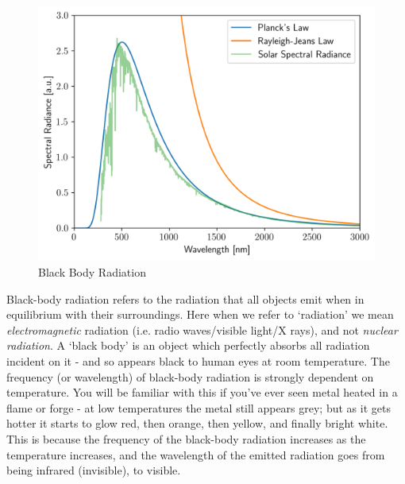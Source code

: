 \documentclass{memoir}[11pt,oneside,a4paper,openany]
\begin{document}
\begin{figure}
	\includegraphics[width=\linewidth]{black_body.png}
	\caption{Black Body Radiation}\label{fig:black_body}
\end{figure}
Black-body radiation refers to the radiation that all objects emit when in equilibrium with their surroundings. Here when we refer to `radiation' we mean \emph{electromagnetic} radiation (i.e. radio waves/visible light/X rays), and not \emph{nuclear radiation}. A `black body' is an object which perfectly absorbs all radiation incident on it - and so appears black to human eyes at room temperature. The frequency (or wavelength) of black-body radiation is strongly dependent on temperature. You will be familiar with this if you've ever seen metal heated in a flame or forge - at low temperatures the metal still appears grey; but as it gets hotter it starts to glow red, then orange, then yellow, and finally bright white. This is because the frequency of the black-body radiation increases as the temperature increases, and the wavelength of the emitted radiation goes from being infrared (invisible), to visible. 
\end{document}
